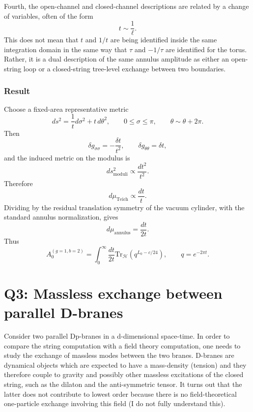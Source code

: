 \documentclass[
  10pt,
  a4paper,
  openany]{book}
\begin{document}
Fourth, the open-channel and closed-channel descriptions are related by
a change of variables, often of the form \[
t\sim \frac{1}{\ell}.
\] This does not mean that \(t\) and \(1/t\) are being identified inside
the same integration domain in the same way that \(\tau\) and
\(-1/\tau\) are identified for the torus. Rather, it is a dual
description of the same annulus amplitude as either an open-string loop
or a closed-string tree-level exchange between two boundaries.

\subsubsection{Result}\label{result-1}

Choose a fixed-area representative metric \[
ds^2
=
\frac{1}{t}d\sigma^2+t\,d\theta^2,
\qquad
0\leq \sigma\leq \pi,
\qquad
\theta\sim\theta+2\pi.
\] Then \[
\delta g_{\sigma\sigma}
=
-\frac{\delta t}{t^2},
\qquad
\delta g_{\theta\theta}
=
\delta t,
\] and the induced metric on the modulus is \[
ds^2_{\mathrm{moduli}}
\propto
\frac{dt^2}{t^2}.
\] Therefore \[
d\mu_{\mathrm{Teich}}
\propto
\frac{dt}{t}.
\] Dividing by the residual translation symmetry of the vacuum cylinder,
with the standard annulus normalization, gives \[
d\mu_{\mathrm{annulus}}
=
\frac{dt}{2t}.
\] Thus \[
A_0^{(g=1,b=2)}
=
\int_0^\infty
\frac{dt}{2t}
\mathrm{Tr}_{\mathcal H}
\left(q^{L_0-c/24}\right),
\qquad
q=e^{-2\pi t}.
\]

\section{Q3: Massless exchange between parallel
D-branes}\label{q3-massless-exchange-between-parallel-d-branes}

Consider two parallel Dp-branes in a d-dimensional space-time. In order
to compare the string computation with a field theory computation, one
needs to study the exchange of massless modes between the two branes.
D-branes are dynamical objects which are expected to have a mass-density
(tension) and they therefore couple to gravity and possibly other
massless excitations of the closed string, such as the dilaton and the
anti-symmetric tensor. It turns out that the latter does not contribute
to lowest order because there is no field-theoretical one-particle
exchange involving this field (I do not fully understand this).
\end{document}
